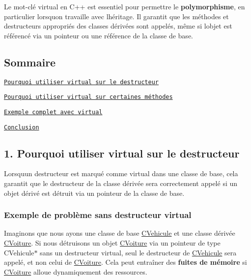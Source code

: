 Le mot-\/clé {\ttfamily virtual} en C++ est essentiel pour permettre le {\bfseries polymorphisme}, en particulier lorsqu\textquotesingle{}on travaille avec l\textquotesingle{}héritage. Il garantit que les méthodes et destructeurs appropriés des classes dérivées sont appelés, même si l\textquotesingle{}objet est référencé via un pointeur ou une référence de la classe de base.

\subsection*{Sommaire}


\begin{DoxyEnumerate}
\item \href{#1-pourquoi-utiliser-virtual-sur-le-destructeur}{\tt Pourquoi utiliser {\ttfamily virtual} sur le destructeur}
\item \href{#2-pourquoi-utiliser-virtual-sur-certaines-méthodes}{\tt Pourquoi utiliser {\ttfamily virtual} sur certaines méthodes}
\item \href{#3-exemple-complet-avec-virtual}{\tt Exemple complet avec {\ttfamily virtual}}
\item \href{#4-conclusion}{\tt Conclusion} 


\end{DoxyEnumerate}

\subsection*{1. Pourquoi utiliser {\ttfamily virtual} sur le destructeur}

Lorsqu\textquotesingle{}un destructeur est marqué comme {\ttfamily virtual} dans une classe de base, cela garantit que le destructeur de la classe dérivée sera correctement appelé si un objet dérivé est détruit via un pointeur de la classe de base.

\subsubsection*{Exemple de problème sans destructeur {\ttfamily virtual}}

Imaginons que nous ayons une classe de base {\ttfamily \hyperlink{classCVehicule}{C\+Vehicule}} et une classe dérivée {\ttfamily \hyperlink{classCVoiture}{C\+Voiture}}. Si nous détruisons un objet {\ttfamily \hyperlink{classCVoiture}{C\+Voiture}} via un pointeur de type {\ttfamily C\+Vehicule$\ast$} sans un destructeur {\ttfamily virtual}, seul le destructeur de {\ttfamily \hyperlink{classCVehicule}{C\+Vehicule}} sera appelé, et non celui de {\ttfamily \hyperlink{classCVoiture}{C\+Voiture}}. Cela peut entraîner des {\bfseries fuites de mémoire} si {\ttfamily \hyperlink{classCVoiture}{C\+Voiture}} alloue dynamiquement des ressources.


